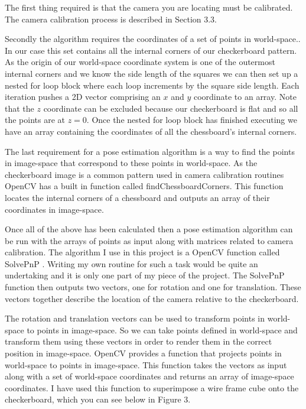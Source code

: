 \documentclass{article}
\begin{document}
The first thing required is that the camera you are locating must be calibrated. The camera calibration process is described in Section 3.3. \par

Secondly the algorithm requires the coordinates of a set of points in world-space.. In our case this set contains all the internal corners of our checkerboard pattern. As the origin of our world-space coordinate system is one of the outermost internal corners and we know the side length of the squares we can then set up a nested for loop block where each loop increments by the square side length. Each iteration pushes a 2D vector comprising an $x$ and $y$ coordinate to an array. Note that the $z$ coordinate can be excluded because our checkerboard is flat and so all the points are at $z = 0$. Once the nested for loop block has finished executing we have an array containing the coordinates of all the chessboard's internal corners. \par

The last requirement for a pose estimation algorithm is a way to find the points in image-space that correspond to these points in world-space. As the checkerboard image is a common pattern used in camera calibration routines OpenCV has a built in function called findChessboardCorners. This function locates the internal corners of a chessboard and outputs an array of their coordinates in image-space. \par

Once all of the above has been calculated then a pose estimation algorithm can be run with the arrays of points as input along with matrices related to camera calibration. The algorithm I use in this project is a OpenCV function called SolvePnP \cite{calib3}. Writing my own routine for such a task would be quite an undertaking and it is only one part of my piece of the project. The SolvePnP function then outputs two vectors, one for rotation and one for translation. These vectors together describe the location of the camera relative to the checkerboard. \par

The rotation and translation vectors can be used to transform points in world-space to points in image-space. So we can take points defined in world-space and transform them using these vectors in order to render them in the correct position in image-space. OpenCV provides a function that projects points in world-space to points in image-space. This function takes the vectors as input along with a set of world-space coordinates and returns an array of image-space coordinates. I have used this function to superimpose a wire frame cube onto the checkerboard, which you can see below in Figure 3.
\end{document}
